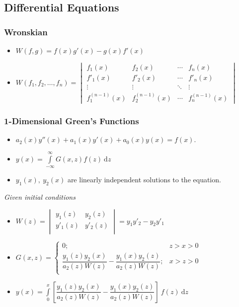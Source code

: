 \documentclass[]{report}
\newcommand \tab[1][1cm]{\hspace*{#1}}
\newcommand{\dn}[1]{\ \mathrm{d}#1}
\newcommand{\itemt}{\item \tab}
\begin{document}
		\subsection{Differential Equations}

\subsubsection{Wronskian}
\def \arraystretch{1.4}
\begin{itemize}
\itemt \( W(f,g) = f(x)g'(x) - g(x)f'(x) \)
\itemt \( W(f_1, f_2, \ldots , f_n) = 
\begin{vmatrix}
f_1(x)			& f_2(x)		& \cdots	& f_n(x) \\
f'_1(x)			& f'_2(x)		& \cdots	& f'_n(x) \\
\vdots			& \vdots		& \ddots	& \vdots \\
f^{(n-1)}_1(x)	& f^{(n-1)}_2(x)& \cdots	& f^{(n-1)}_n(x)
\end{vmatrix} \)
\end{itemize}

\subsubsection{1-Dimensional Green's Functions}
\begin{itemize}
\itemt \(  a_2(x)y''(x) + a_1(x)y'(x) + a_0(x)y(x) = f(x) \).
\itemt \( y(x) = \int\limits^\infty_{-\infty} G(x,z) f(z) \dn z \)
\itemt \( y_1(x),\ y_2(x) \) are linearly independent solutions to the equation.
\end{itemize}

\textit{Given initial conditions}
\def \arraystretch{1.4}
\begin{itemize}
\itemt \( W(z) = 
\begin{vmatrix}
y_1(z)	&	y_2(z)	\\
y'_1(z)	&	y'_2(z)	\\
\end{vmatrix} = y_1 y'_2 - y_2 y'_1 \)
\itemt \( G(x,z) = 
\begin{cases}
0;									& z>x>0 \\
\dfrac{y_1(z)y_2(x)}{a_2(z)W(z)} - \dfrac{y_1(x)y_2(z)}{a_2(z)W(z)};	& x>z>0 \\
\end{cases}\)
\itemt \( y(x) = \int\limits^x_0 [\dfrac{y_1(z)y_2(x)}{a_2(z)W(z)} - \dfrac{y_1(x)y_2(z)}{a_2(z)W(z)}]\ f(z) \dn z \)
\end{itemize}
\end{document}
